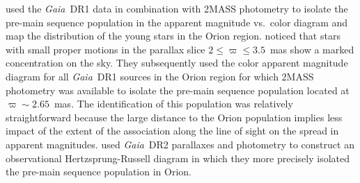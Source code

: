 \documentclass[RNAAS]{aastex62}
\newcommand\gaia{\textit{Gaia}}
\newcommand\gdr[1]{\gaia~DR#1}
\begin{document}
\cite{Zari17} used the \gdr{1} \citep{Prusti16,Brown16} data in combination with 2MASS photometry \citep{Skrutskie06} to isolate the pre-main sequence population in the apparent magnitude vs.\ color diagram and map the distribution of the young stars in the Orion region. \cite{Zari17} noticed that stars with small proper motions in the parallax slice $2\leq\varpi\leq3.5$~mas show a marked concentration on the sky. They subsequently used the color apparent magnitude diagram for all \gdr{1} sources in the Orion region for which 2MASS photometry was available to isolate the pre-main sequence population located at $\varpi\sim2.65$~mas. The identification of this population was relatively straightforward because the large distance to the Orion population implies less impact of the extent of the association along the line of sight on the spread in apparent magnitudes. \cite{Kounkel18} used \gdr{2} \citep{Brown18} parallaxes and photometry to construct an observational Hertzsprung-Russell diagram in which they more precisely isolated the pre-main sequence population in Orion.
\end{document}
